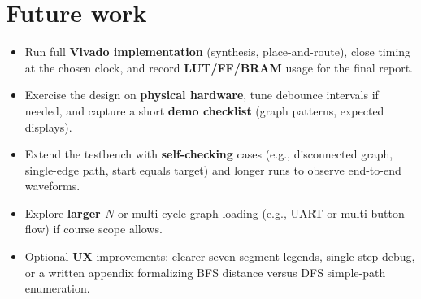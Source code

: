 \documentclass[11pt,a4paper]{article}
\begin{document}
\section{Future work}

\begin{itemize}
  \item Run full \textbf{Vivado implementation} (synthesis, place-and-route), close timing at the chosen clock, and record \textbf{LUT/FF/BRAM} usage for the final report.
  \item Exercise the design on \textbf{physical hardware}, tune debounce intervals if needed, and capture a short \textbf{demo checklist} (graph patterns, expected displays).
  \item Extend the testbench with \textbf{self-checking} cases (e.g., disconnected graph, single-edge path, start equals target) and longer runs to observe end-to-end waveforms.
  \item Explore \textbf{larger $N$} or multi-cycle graph loading (e.g., UART or multi-button flow) if course scope allows.
  \item Optional \textbf{UX} improvements: clearer seven-segment legends, single-step debug, or a written appendix formalizing BFS distance versus DFS simple-path enumeration.
\end{itemize}
\end{document}
